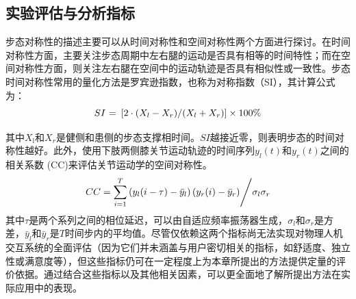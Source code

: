 \subsection{实验评估与分析指标}步态对称性的描述主要可以从时间对称性和空间对称性两个方面进行探讨。在时间对称性方面，主要关注步态周期中左右腿的运动是否具有相等的时间特性；而在空间对称性方面，则关注左右腿在空间中的运动轨迹是否具有相似性或一致性。步态时间对称性常用的量化方法是罗宾逊指数\cite{viteckovaGaitSymmetryMeasures2018}，也称为对称指数（SI），其计算公式为：
\begin{equation}
\label{deqn_ex21}
{SI}{\text{ = }}\left[ {{{2 \cdot \left( {{X_l} - {X_r}} \right)} \mathord{\left/
{\vphantom {{2 \cdot \left( {{X_l} - {X_r}} \right)} {\left( {{X_l} + {X_r}} \right)}}} \right.
\kern-\nulldelimiterspace} {\left( {{X_l} + {X_r}} \right)}}} \right] \times 100 \%  
\end{equation}

其中${X_{\text{l}}}$和${X_r}$是健侧和患侧的步态支撑相时间。$SI$越接近零，则表明步态的时间对称性越好。此外，使用下肢两侧膝关节运动轨迹的时间序列${y_l(t)}$和${y_r(t)}$之间的相关系数 (CC)\cite{gouwandaIdentifyingGaitAsymmetry2011}来评估关节运动学的空间对称性。
\begin{equation}
\label{deqn_ex22}
CC = {{\sum\limits_{i = 1}^T {\left( {{y_l}(i - \tau) - {{\bar y}_l}} \right)} \left( {{y_r}(i ) - {{\bar y}_r}} \right)} \mathord{\left/
{\vphantom {{\sum\limits_{i = 1}^T {\left( {{y_l}(i) - {{\bar y}_l}} \right)}\left( {{y_r}(i + \tau ) - {{\bar y}_r}} \right)} {{\sigma _l}{\sigma _r}}}} \right.
\kern-\nulldelimiterspace} {{\sigma _l}{\sigma _r}}}
\end{equation}
其中$\tau$是两个系列之间的相位延迟，可以由自适应频率振荡器生成，${\sigma _l}$和${\sigma _r}$是方差，$\bar y_l$和$\bar y_r$是${T}$时间步内的平均值。尽管仅依赖这两个指标尚无法实现对物理人机交互系统的全面评估（因为它们并未涵盖与用户密切相关的指标，如舒适度、独立性或满意度等），但这些指标仍可在一定程度上为本章所提出的方法提供定量的评价依据。通过结合这些指标以及其他相关因素，可以更全面地了解所提出方法在实际应用中的表现。

